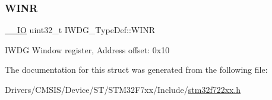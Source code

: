 \subsubsection{\texorpdfstring{WINR}{WINR}}
{\footnotesize\ttfamily \mbox{\hyperlink{core__sc300_8h_aec43007d9998a0a0e01faede4133d6be}{\+\_\+\+\_\+\+IO}} uint32\+\_\+t I\+W\+D\+G\+\_\+\+Type\+Def\+::\+W\+I\+NR}

I\+W\+DG Window register, Address offset\+: 0x10 

The documentation for this struct was generated from the following file\+:\begin{DoxyCompactItemize}
\item 
Drivers/\+C\+M\+S\+I\+S/\+Device/\+S\+T/\+S\+T\+M32\+F7xx/\+Include/\mbox{\hyperlink{stm32f722xx_8h}{stm32f722xx.\+h}}\end{DoxyCompactItemize}
